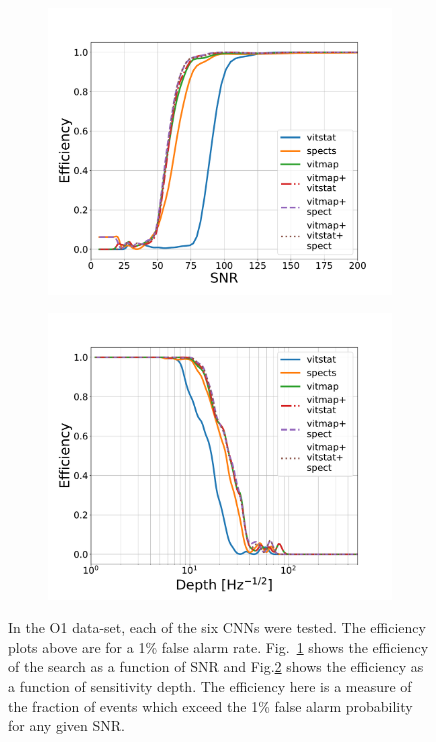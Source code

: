 \begin{figure}
	\begin{subfigure}[h]{0.5\textwidth}
		\includegraphics[width=\columnwidth]{C4_cnn/o1_snr_eff.pdf}
		\caption{\label{machine:results:snr_o1}}
	\end{subfigure}
	\begin{subfigure}[h]{0.5\textwidth}
		\includegraphics[width=\columnwidth]{C4_cnn/o1_depth_eff.pdf}
		\caption{}
		\label{machine:results:depth_o1}
	\end{subfigure}
	\caption[O1 results from SOAP and \gls{CNN} search.]{ In the O1 data-set, each of the six \glspl{CNN} were tested. The efficiency plots above are for a 1\% false alarm rate. Fig.~\ref{machine:results:snr_o1} shows the efficiency of the search as a function of \gls{SNR} and Fig.\ref{machine:results:depth_o1} shows the efficiency as a function of sensitivity depth.
		The efficiency here is a measure of the fraction of events which exceed the 1\% false alarm probability for any given \gls{SNR}.}
	\label{machine:results:o1}
	
\end{figure}


